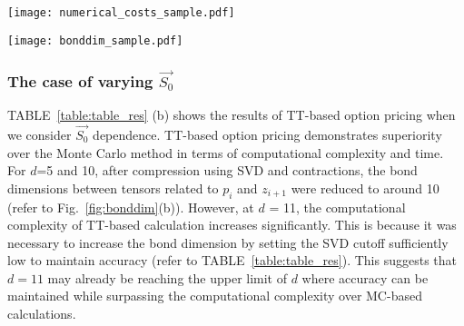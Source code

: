 \begin{figure*}[htbp]
    \centering
        \texttt{[image: numerical\_costs\_sample.pdf]}
        \caption{ 
        The computational complexity of TT-based and MC-based option pricing, denoted as $c_{\mathrm{TT}}$ and $c_{\mathrm{MC}}$, versus the number of assets $d$.
        We consider including parameter dependencies on $\vec{\sigma}$ and $\vec{S_0}$ in TTs.
        In TT-based option pricing with $\vec{S_0}$, the sharp increase in computational complexity at $d=11$ arises.
        This stems from the larger bond dimensions with a sufficiently low cutoff value for SVD in order to maintain its accuracy
        }
\label{fig:table_cc}
\end{figure*}


\begin{figure*}[htbp]
    \centering
\texttt{[image: bonddim\_sample.pdf]}
        \caption{
        The bond dimensions $\chi_{l}$ of each bond $l$ for $\phi$ and $\hat{v}$, obtained through TCI and SVD, incorporating dependencies on (a) $\vec{\sigma}$ and (b) $\vec{S}_0$. 
        The odd bond $l=2i-1$ connects the core tensors for $j_i$ and $k_i$, the indexes for $z_i$ and $p_i$, respectively, and the even bond $l=2i$ connects those for $k_i$ and $j_{i+1}$.
        In the cases corresponding to the left panels and the bottom right panel, $\hat{v}$ does not depend on parameters, and thus the bond $l$ takes only even values $2i$ (connecting the core tensors for $z_i$ and $z_{i+1}$).
        It is noteworthy that the graph of bond dimensions exhibits a characteristic jagged shape. 
        The bond dimensions between sites for $j_i$ and $k_{i}$, which are related to the same asset, are large, and the ones between sites for $k_i$ and $j_{i+1}$, which are related to different assets, are small. 
       }
\label{fig:bonddim}
\end{figure*}

\subsubsection{The case of varying $\vec{S_0}$}
TABLE~\ref{table:table_res} (b) shows the results of TT-based option pricing when we consider $\vec{S_0}$ dependence.
TT-based option pricing demonstrates superiority over the Monte Carlo method in terms of computational complexity and time. 
For $d$=5 and 10, after compression using SVD and contractions, the bond dimensions between tensors related to $p_i$ and $z_{i+1}$ were reduced to around 10 (refer to Fig.~\ref{fig:bonddim}(b)).
However, at $d$ = 11, the computational complexity of TT-based calculation increases significantly. 
This is because it was necessary to increase the bond dimension by setting the SVD cutoff sufficiently low to maintain accuracy (refer to TABLE~\ref{table:table_res}). 
This suggests that $d=11$ may already be reaching the upper limit of $d$ where accuracy can be maintained while surpassing the computational complexity over MC-based calculations.

